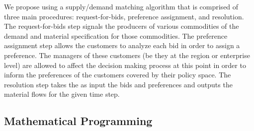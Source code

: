 We propose using a supply/demand matching algorithm that is comprised 
of three main procedures: request-for-bids, preference assignment, 
and resolution. The request-for-bids step signals the producers of 
various commodities of the demand and material specification for 
those commodities. The preference assignment step allows the customers
to analyze each bid in order to assign a preference. The managers of 
these customers (be they at the region or enterprise level) are 
allowed to affect the decision making process at this point in order 
to inform the preferences of the customers covered by their policy 
space. The resolution step takes the as input the bids and 
preferences and outputs the material flows for the given time step.\cite{cyclus2012}

\subsection{Mathematical Programming}
